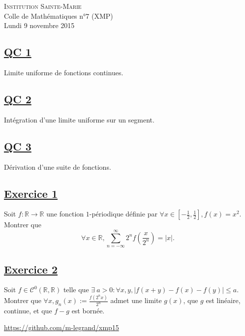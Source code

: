 \documentclass[12pt,a4paper]{report}
\begin{document}
\newcommand{\rA}{\mathcal{A}}
\newcommand{\rB}{\mathcal{B}}
\newcommand{\rC}{\mathcal{C}}
\newcommand{\rG}{\mathcal{G}}
\newcommand{\rF}{\mathcal{F}}
\newcommand{\rO}{\mathcal{O}}
\newcommand{\rP}{\mathcal{P}}
\newcommand{\rH}{\mathcal{H}}
\newcommand{\rR}{\mathcal{R}}
\newcommand{\rE}{\mathcal{E}}
\newcommand{\rL}{\mathcal{L}}
\newcommand{\rM}{\mathcal{M}}
\newcommand{\bK}{\mathbb{K}}
\newcommand{\bQ}{\mathbb{Q}}
\newcommand{\bR}{\mathbb{R}}
\newcommand{\bZ}{\mathbb{Z}}
\newcommand{\bN}{\mathbb{N}}
\newcommand{\bC}{\mathbb{C}}
\newcommand{\bP}{\mathbb{P}}
\newcommand{\bF}{\mathbb{F}}

\ifpdf
{}
\else
{}
\fi

\pagestyle{empty} %

\noindent \textsc{Institution Sainte-Marie}\\
Colle de Mathématiques n°7 (XMP)\\
Lundi 9 novembre 2015


\subsection*{\underline{QC 1}}
Limite uniforme de fonctions continues.

\subsection*{\underline{QC 2}}
Intégration d'une limite uniforme sur un segment.

\subsection*{\underline{QC 3}}
Dérivation d'une suite de fonctions.

\subsection*{\underline{Exercice 1}}
Soit $f : \bR \rightarrow \bR$ une fonction $1$-périodique définie par $\forall x \in [-\frac{1}{2}, \frac{1}{2}], f(x) = x^2$. Montrer que $$\forall x \in \bR, \sum\limits_{n=-\infty}^\infty 2^nf\left(\frac{x}{2^n}\right) = |x|.$$

\subsection*{\underline{Exercice 2}}
Soit $f \in \rC^0(\bR, \bR)$ telle que $\exists \ a>0 : \forall x,y, |f(x+y)-f(x)-f(y)| \leq a$. Montrer que $\forall x, g_n(x):=\frac{f(2^nx)}{2^n}$ admet une limite $g(x)$, que $g$ est linéaire, continue, et que $f-g$ est bornée.

\vfill

\begin{center}
\url{https://github.com/m-legrand/xmp15}
\end{center}
\end{document}
